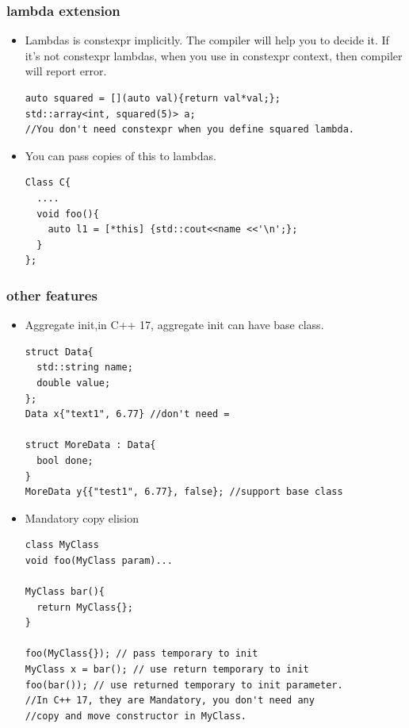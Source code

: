 \documentclass[a4paper,11pt,twoside]{book}
\begin{document}
\subsubsection{lambda extension}
\begin{itemize}
    \item Lambdas is constexpr implicitly. The compiler will help you to decide it. If it's not constexpr lambdas, when you use in constexpr context, then compiler will report error. 
\begin{lstlisting}
auto squared = [](auto val){return val*val;};
std::array<int, squared(5)> a;
//You don't need constexpr when you define squared lambda.
\end{lstlisting}

    \item You can pass copies of this to lambdas.
\begin{lstlisting}
Class C{
  ....
  void foo(){
    auto l1 = [*this] {std::cout<<name <<'\n';};
  }
};
\end{lstlisting}
\end{itemize}

\subsubsection{other features}
\begin{itemize}

    \item Aggregate init,in C++ 17, aggregate init can have base class.
\begin{lstlisting}
struct Data{
  std::string name;
  double value;
};
Data x{"text1", 6.77} //don't need =

struct MoreData : Data{
  bool done;
}
MoreData y{{"test1", 6.77}, false}; //support base class
\end{lstlisting}

    \item Mandatory copy elision
\begin{lstlisting}
class MyClass
void foo(MyClass param)...

MyClass bar(){
  return MyClass{};
}

foo(MyClass{}); // pass temporary to init
MyClass x = bar(); // use return temporary to init
foo(bar()); // use returned temporary to init parameter.
//In C++ 17, they are Mandatory, you don't need any 
//copy and move constructor in MyClass.
\end{lstlisting}

\end{itemize}
\end{document}
